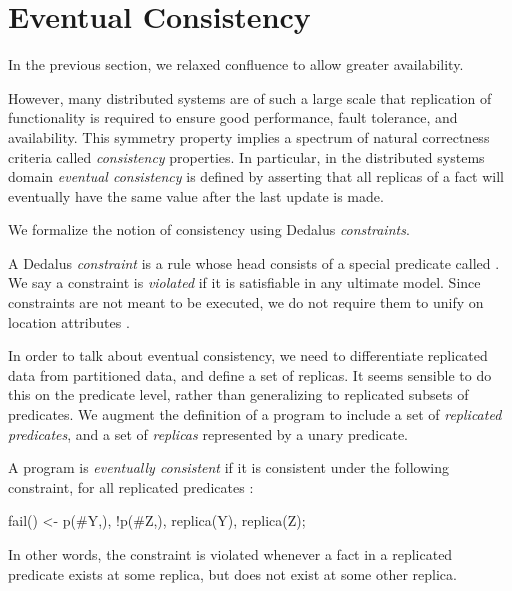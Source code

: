 \section{Eventual Consistency}
\label{sec:consistency}

In the previous section, we relaxed confluence to allow greater availability.

However, many distributed systems are of such a large scale that replication of functionality is required to ensure good performance, fault tolerance, and availability.  This symmetry property implies a spectrum of natural correctness criteria called {\em consistency} properties.  In particular, in the distributed systems domain {\em eventual consistency} is defined by asserting that all replicas of a fact will eventually have the same value after the last update is made. 


We formalize the notion of consistency using Dedalus {\em constraints}.

\begin{definition}
A Dedalus {\em constraint} is a rule whose head consists of a special predicate called .  We say a constraint is {\em violated} if it is satisfiable in any ultimate model.  Since constraints are not meant to be executed, we do not require them to unify on location attributes .
\end{definition}

In order to talk about eventual consistency, we need to differentiate replicated data from partitioned  data, and define a set of replicas.    It seems sensible to do this on the predicate level, rather than generalizing to replicated subsets of predicates.  We augment the definition of a \lang program to include a set of {\em replicated predicates}, and a set of {\em replicas} represented by a unary  predicate.  

\begin{definition}
\label{def:ec}
A \lang program is {\em eventually consistent} if it is consistent under the following constraint, for all replicated predicates :

\begin{Dedalus}
fail() <- p(#Y,), !p(#Z,), replica(Y), replica(Z);
\end{Dedalus}

In other words, the constraint is violated whenever a fact in a replicated predicate exists at some replica, but does not exist at some other replica.
\end{definition}

